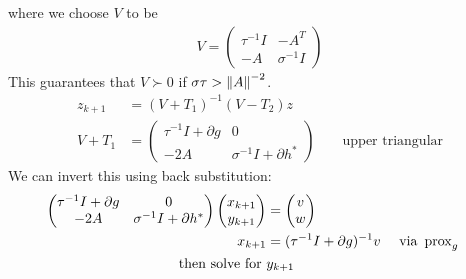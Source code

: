 \documentclass[class=article,crop=false]{standalone}
\begin{document}
where we choose $ V$ to be
\begin{align*}
	V = \begin{pmatrix} \tau^{-1}I& -A^{T}\\-A& \sigma^{-1}I \end{pmatrix} 
\end{align*}
This guarantees that $ V \succ 0$ if $ \sigma \tau > {\left\lVert{ A}\right\rVert}^{-2} $.
\begin{align*}
	z_{k+1} &= (V+T_1)^{-1}(V-T_2) z\\
	V+T_1 &= \begin{pmatrix} \tau^{-1}I + \partial g&0\\-2A& \sigma^{-1}I + \partial h^*  \end{pmatrix} && \text{ upper triangular} 
\end{align*}
We can invert this using back substitution:
\begin{align*}
	\begin{pmatrix} \tau^{-1}I + \partial g&0\\-2A & \sigma^{-1}I + \partial h^*  \end{pmatrix} \begin{pmatrix} x_{k+1}\\y_{k+1} \end{pmatrix} &= \begin{pmatrix} v\\w \end{pmatrix}\\
	x_{k+1} &= (\tau^{-1} I + \partial g)^{-1}v && \text{ via } \operatorname{prox}_g \\
	\text{ then solve for } &y_{k+1} 
\end{align*}
\end{document}
